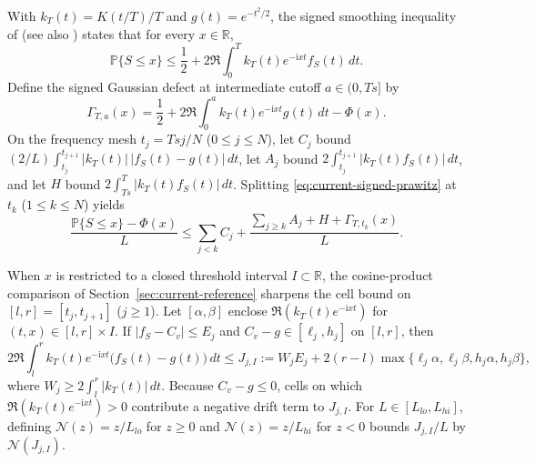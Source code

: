 \documentclass[11pt]{article}
\numberwithin{equation}{section}
\theoremstyle{remark}
\newcommand{\Prob}{\mathbb P}
\newcommand{\R}{\mathbb R}
\newcommand{\ii}{\mathrm i}
\begin{document}
With $k_T(t)=K(t/T)/T$ and $g(t)=e^{-t^2/2}$, the signed smoothing inequality
of \citet{Prawitz1972} (see also \citet[eqs.~(2.2)--(2.6)]{Pinelis2013})
states that for every $x\in\R$,
\begin{equation}\label{eq:current-signed-prawitz}
 \Prob\{S\le x\}\le\frac12+2\Re\int_0^Tk_T(t)e^{-\ii xt}f_S(t)\,dt.
\end{equation}
Define the signed Gaussian defect at intermediate cutoff $a\in(0,Ts]$ by
\[
 \Gamma_{T,a}(x)=\frac12+2\Re\int_0^ak_T(t)e^{-\ii xt}g(t)\,dt-\Phi(x).
\]
On the frequency mesh $t_j=Tsj/N$ ($0\le j\le N$), let $C_j$ bound
$(2/L)\int_{t_j}^{t_{j+1}}|k_T(t)|\,|f_S(t)-g(t)|\,dt$, let $A_j$ bound
$2\int_{t_j}^{t_{j+1}}|k_T(t)f_S(t)|\,dt$, and let $H$ bound
$2\int_{Ts}^T|k_T(t)f_S(t)|\,dt$. Splitting \eqref{eq:current-signed-prawitz}
at $t_k$ ($1\le k\le N$) yields
\begin{equation}\label{eq:current-cutoff}
 \frac{\Prob\{S\le x\}-\Phi(x)}L
 \le\sum_{j<k}C_j+\frac{\sum_{j\ge k}A_j+H+\Gamma_{T,t_k}(x)}L.
\end{equation}

When $x$ is restricted to a closed threshold interval $I\subset\R$, the
cosine-product comparison of Section~\ref{sec:current-reference} sharpens the
cell bound on $[l,r]=[t_j,t_{j+1}]$ ($j\ge1$). Let $[\alpha,\beta]$ enclose
$\Re(k_T(t)e^{-\ii xt})$ for $(t,x)\in[l,r]\times I$. If $|f_S-C_v|\le E_j$
and $C_v-g\in[\ell_j,h_j]$ on $[l,r]$, then
\begin{equation}\label{eq:current-signed-cell}
 2\Re\int_l^rk_T(t)e^{-\ii xt}\bigl(f_S(t)-g(t)\bigr)\,dt
 \le J_{j,I}:=W_jE_j+2(r-l)
 \max\{\ell_j\alpha,\ell_j\beta,h_j\alpha,h_j\beta\},
\end{equation}
where $W_j\ge2\int_l^r|k_T(t)|\,dt$. Because $C_v-g\le0$, cells on which
$\Re(k_T(t)e^{-\ii xt})>0$ contribute a negative drift term to $J_{j,I}$.
For $L\in[L_{lo},L_{hi}]$, defining $\mathcal N(z)=z/L_{lo}$ for $z\ge0$ and
$\mathcal N(z)=z/L_{hi}$ for $z<0$ bounds $J_{j,I}/L$ by $\mathcal N(J_{j,I})$.
\end{document}
